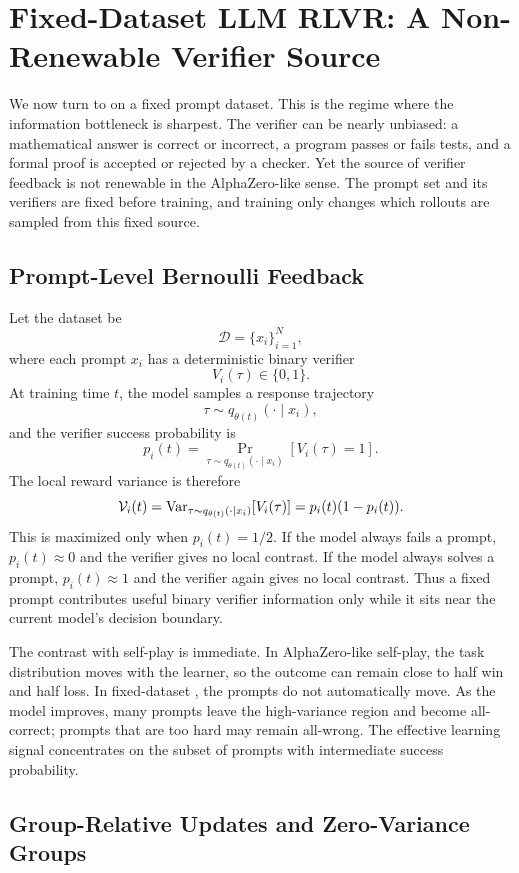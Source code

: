\section{Fixed-Dataset LLM RLVR: A Non-Renewable Verifier Source}

We now turn to \llm{} \rlvr{} on a fixed prompt dataset. This is the regime where the information bottleneck is sharpest. The verifier can be nearly unbiased: a mathematical answer is correct or incorrect, a program passes or fails tests, and a formal proof is accepted or rejected by a checker. Yet the source of verifier feedback is not renewable in the AlphaZero-like sense. The prompt set and its verifiers are fixed before training, and training only changes which rollouts are sampled from this fixed source.

\subsection{Prompt-Level Bernoulli Feedback}

Let the dataset be
\[
  \mathcal{D}=\{x_i\}_{i=1}^N,
\]
where each prompt $x_i$ has a deterministic binary verifier
\[
  V_i(\tau)\in\{0,1\}.
\]
At training time $t$, the model samples a response trajectory
\[
  \tau\sim q_{\theta(t)}(\cdot\mid x_i),
\]
and the verifier success probability is
\[
  p_i(t)
  =
  \Pr_{\tau\sim q_{\theta(t)}(\cdot\mid x_i)}
  [V_i(\tau)=1].
\]
The local reward variance is therefore
\[
  \mathcal{V}_i(t)
  =
  \mathrm{Var}_{\tau\sim q_{\theta(t)}(\cdot\mid x_i)}
  [V_i(\tau)]
  =
  p_i(t)(1-p_i(t)).
\]
This is maximized only when $p_i(t)=1/2$. If the model always fails a prompt, $p_i(t)\approx 0$ and the verifier gives no local contrast. If the model always solves a prompt, $p_i(t)\approx 1$ and the verifier again gives no local contrast. Thus a fixed prompt contributes useful binary verifier information only while it sits near the current model's decision boundary.

The contrast with self-play is immediate. In AlphaZero-like self-play, the task distribution moves with the learner, so the outcome can remain close to half win and half loss. In fixed-dataset \llm{} \rlvr{}, the prompts do not automatically move. As the model improves, many prompts leave the high-variance region and become all-correct; prompts that are too hard may remain all-wrong. The effective learning signal concentrates on the subset of prompts with intermediate success probability.

\subsection{Group-Relative Updates and Zero-Variance Groups}

